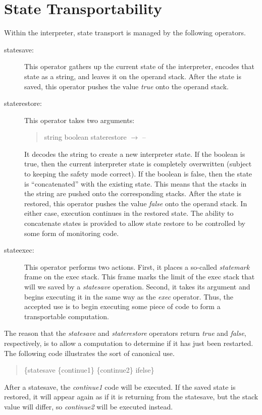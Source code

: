 \section{State Transportability}
\label{state}
Within the interpreter, state transport
is managed by the following operators.
\begin{description}
\item[statesave:]
This operator gathers up the current state of the interpreter,
encodes that state as a string, and leaves it on the operand stack.
After the state is saved, this operator pushes the value {\em true}
onto the operand stack.
\item[staterestore:]
This operator takes two arguments:
\begin{quote}
string boolean staterestore $\rightarrow$\hskip0.25in --
\end{quote}
It decodes the string to create a new interpreter state.
If the boolean is true, then the current interpreter state
is completely overwritten (subject to keeping the safety mode
correct).  If the boolean is false, then the state is ``concatenated''
with the existing state.  This means that the stacks in the string
are pushed onto the corresponding stacks.
After the state is restored, this operator pushes the value {\em false}
onto the operand stack.
In either case, execution continues in the restored state.
The ability to concatenate states is provided to allow
state restore to be controlled by some form of monitoring code.
\item[stateexec:]
This operator performs two actions.
First, it places a so-called {\em statemark} frame
on the exec stack.  This frame marks the limit of the exec
stack that will we saved by a {\em statesave} operation.
Second, it takes its argument and begins executing it
in the same way as the {\em exec} operator.
Thus, the accepted use is to begin executing some piece of
code to form a transportable computation. 
\end{description}

The reason that the {\em statesave} and {\em staterestore}
operators return {\em true} and {\em false}, respectively,
is to allow a computation to determine if it has just been
restarted.  The following code illustrates
the sort of canonical use.
\begin{quote}
\{statesave \{continue1\} \{continue2\} ifelse\}
\end{quote}
After a statesave, the {\em continue1} code will be executed.
If the saved state is restored, it will appear
again as if it is returning from the statesave, but
the stack value will differ, so {\em continue2} will be executed instead.

